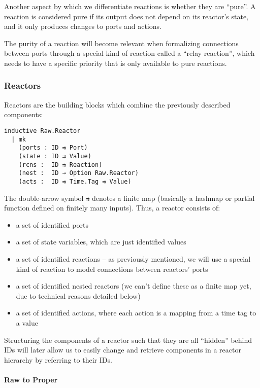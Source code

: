 Another aspect by which we differentiate reactions is whether they are ``pure''.
A reaction is considered pure if its output does not depend on its reactor's state, and it only produces changes to ports and actions.

The purity of a reaction will become relevant when formalizing connections between ports through a special kind of reaction called a ``relay reaction'', which needs to have a specific priority that is only available to pure reactions. 

\subsubsection{Reactors}

Reactors are the building blocks which combine the previously described components:

\begin{lstlisting}
inductive Raw.Reactor 
  | mk 
    (ports : ID ⇉ Port)
    (state : ID ⇉ Value)
    (rcns :  ID ⇉ Reaction)
    (nest :  ID → Option Raw.Reactor)
    (acts :  ID ⇉ Time.Tag ⇉ Value)
\end{lstlisting}

The double-arrow symbol \lstinline{⇉} denotes a finite map (basically a hashmap or partial function defined on finitely many inputs).
Thus, a reactor consists of:

\begin{itemize}
    \item a set of identified ports
    \item a set of state variables, which are just identified values
    \item a set of identified reactions -- as previously mentioned, we will use a special kind of reaction to model connections between reactors' ports
    \item a set of identified nested reactors (we can't define these as a finite map yet, due to technical reasons detailed below)
    \item a set of identified actions, where each action is a mapping from a time tag to a value
\end{itemize}

Structuring the components of a reactor such that they are all ``hidden'' behind IDs will later allow us to easily change and retrieve components in a reactor hierarchy by referring to their IDs.

\paragraph{Raw to Proper}

